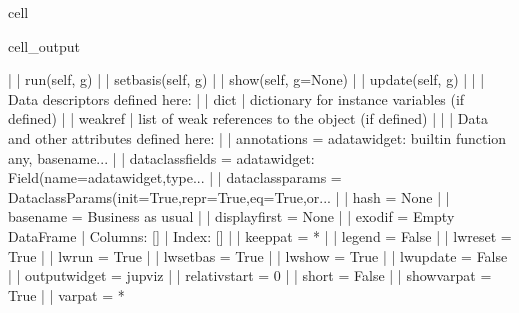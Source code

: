 \documentclass[letterpaper,10pt,english]{jupyterBook}
\begin{document}
\begin{sphinxuseclass}{cell}
\begin{sphinxVerbatimOutput}
\begin{sphinxuseclass}{cell_output}
\begin{sphinxVerbatim}[commandchars=\\\{\}]
     |  
     |  run(self, g)
     |  
     |  setbasis(self, g)
     |  
     |  show(self, g=None)
     |  
     |  update(self, g)
     |  
     |  \PYGZhy{}\PYGZhy{}\PYGZhy{}\PYGZhy{}\PYGZhy{}\PYGZhy{}\PYGZhy{}\PYGZhy{}\PYGZhy{}\PYGZhy{}\PYGZhy{}\PYGZhy{}\PYGZhy{}\PYGZhy{}\PYGZhy{}\PYGZhy{}\PYGZhy{}\PYGZhy{}\PYGZhy{}\PYGZhy{}\PYGZhy{}\PYGZhy{}\PYGZhy{}\PYGZhy{}\PYGZhy{}\PYGZhy{}\PYGZhy{}\PYGZhy{}\PYGZhy{}\PYGZhy{}\PYGZhy{}\PYGZhy{}\PYGZhy{}\PYGZhy{}\PYGZhy{}\PYGZhy{}\PYGZhy{}\PYGZhy{}\PYGZhy{}\PYGZhy{}\PYGZhy{}\PYGZhy{}\PYGZhy{}\PYGZhy{}\PYGZhy{}\PYGZhy{}\PYGZhy{}\PYGZhy{}\PYGZhy{}\PYGZhy{}\PYGZhy{}\PYGZhy{}\PYGZhy{}\PYGZhy{}\PYGZhy{}\PYGZhy{}\PYGZhy{}\PYGZhy{}\PYGZhy{}\PYGZhy{}\PYGZhy{}\PYGZhy{}\PYGZhy{}\PYGZhy{}\PYGZhy{}\PYGZhy{}\PYGZhy{}\PYGZhy{}\PYGZhy{}\PYGZhy{}
     |  Data descriptors defined here:
     |  
     |  \PYGZus{}\PYGZus{}dict\PYGZus{}\PYGZus{}
     |      dictionary for instance variables (if defined)
     |  
     |  \PYGZus{}\PYGZus{}weakref\PYGZus{}\PYGZus{}
     |      list of weak references to the object (if defined)
     |  
     |  \PYGZhy{}\PYGZhy{}\PYGZhy{}\PYGZhy{}\PYGZhy{}\PYGZhy{}\PYGZhy{}\PYGZhy{}\PYGZhy{}\PYGZhy{}\PYGZhy{}\PYGZhy{}\PYGZhy{}\PYGZhy{}\PYGZhy{}\PYGZhy{}\PYGZhy{}\PYGZhy{}\PYGZhy{}\PYGZhy{}\PYGZhy{}\PYGZhy{}\PYGZhy{}\PYGZhy{}\PYGZhy{}\PYGZhy{}\PYGZhy{}\PYGZhy{}\PYGZhy{}\PYGZhy{}\PYGZhy{}\PYGZhy{}\PYGZhy{}\PYGZhy{}\PYGZhy{}\PYGZhy{}\PYGZhy{}\PYGZhy{}\PYGZhy{}\PYGZhy{}\PYGZhy{}\PYGZhy{}\PYGZhy{}\PYGZhy{}\PYGZhy{}\PYGZhy{}\PYGZhy{}\PYGZhy{}\PYGZhy{}\PYGZhy{}\PYGZhy{}\PYGZhy{}\PYGZhy{}\PYGZhy{}\PYGZhy{}\PYGZhy{}\PYGZhy{}\PYGZhy{}\PYGZhy{}\PYGZhy{}\PYGZhy{}\PYGZhy{}\PYGZhy{}\PYGZhy{}\PYGZhy{}\PYGZhy{}\PYGZhy{}\PYGZhy{}\PYGZhy{}\PYGZhy{}
     |  Data and other attributes defined here:
     |  
     |  \PYGZus{}\PYGZus{}annotations\PYGZus{}\PYGZus{} = \PYGZob{}\PYGZsq{}a\PYGZus{}datawidget\PYGZsq{}: \PYGZlt{}built\PYGZhy{}in function any\PYGZgt{}, \PYGZsq{}basename\PYGZsq{}...
     |  
     |  \PYGZus{}\PYGZus{}dataclass\PYGZus{}fields\PYGZus{}\PYGZus{} = \PYGZob{}\PYGZsq{}a\PYGZus{}datawidget\PYGZsq{}: Field(name=\PYGZsq{}a\PYGZus{}datawidget\PYGZsq{},type...
     |  
     |  \PYGZus{}\PYGZus{}dataclass\PYGZus{}params\PYGZus{}\PYGZus{} = \PYGZus{}DataclassParams(init=True,repr=True,eq=True,or...
     |  
     |  \PYGZus{}\PYGZus{}hash\PYGZus{}\PYGZus{} = None
     |  
     |  basename = \PYGZsq{}Business as usual\PYGZsq{}
     |  
     |  display\PYGZus{}first = None
     |  
     |  exodif = Empty DataFrame
     |  Columns: []
     |  Index: []
     |  
     |  keeppat = \PYGZsq{}*\PYGZsq{}
     |  
     |  legend = False
     |  
     |  lwreset = True
     |  
     |  lwrun = True
     |  
     |  lwsetbas = True
     |  
     |  lwshow = True
     |  
     |  lwupdate = False
     |  
     |  outputwidget = \PYGZsq{}jupviz\PYGZsq{}
     |  
     |  relativ\PYGZus{}start = 0
     |  
     |  short = False
     |  
     |  showvarpat = True
     |  
     |  varpat = \PYGZsq{}*\PYGZsq{}
    

\end{sphinxVerbatim}
\end{sphinxuseclass}
\end{sphinxVerbatimOutput}
\end{sphinxuseclass}
\end{document}
